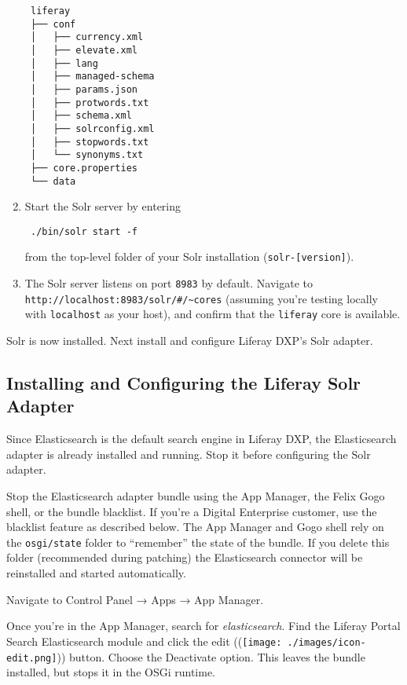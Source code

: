 \begin{enumerate}
\begin{verbatim}
 liferay
 ├── conf
 │   ├── currency.xml
 │   ├── elevate.xml
 │   ├── lang
 │   ├── managed-schema
 │   ├── params.json
 │   ├── protwords.txt
 │   ├── schema.xml
 │   ├── solrconfig.xml
 │   ├── stopwords.txt
 │   └── synonyms.txt
 ├── core.properties
 └── data
\end{verbatim}
\item
  Start the Solr server by entering

\begin{verbatim}
 ./bin/solr start -f
\end{verbatim}

  from the top-level folder of your Solr installation
  (\texttt{solr-{[}version{]}}).
\item
  The Solr server listens on port \texttt{8983} by default. Navigate to
  \texttt{http://localhost:8983/solr/\#/\textasciitilde{}cores}
  (assuming you're testing locally with \texttt{localhost} as your
  host), and confirm that the \texttt{liferay} core is available.
\end{enumerate}

Solr is now installed. Next install and configure Liferay DXP's Solr
adapter.

\subsection{Installing and Configuring the Liferay Solr
Adapter}\label{installing-and-configuring-the-liferay-solr-adapter}

Since Elasticsearch is the default search engine in Liferay DXP, the
Elasticsearch adapter is already installed and running. Stop it before
configuring the Solr adapter.

Stop the Elasticsearch adapter bundle using the App Manager, the Felix
Gogo shell, or the bundle blacklist. If you're a Digital Enterprise
customer, use the blacklist feature as described below. The App Manager
and Gogo shell rely on the \texttt{osgi/state} folder to ``remember''
the state of the bundle. If you delete this folder (recommended during
patching) the Elasticsearch connector will be reinstalled and started
automatically.

Navigate to Control Panel → Apps → App Manager.

Once you're in the App Manager, search for \emph{elasticsearch}. Find
the Liferay Portal Search Elasticsearch module and click the edit
((\texttt{[image: ./images/icon-edit.png]})) button. Choose the
Deactivate option. This leaves the bundle installed, but stops it in the
OSGi runtime.

